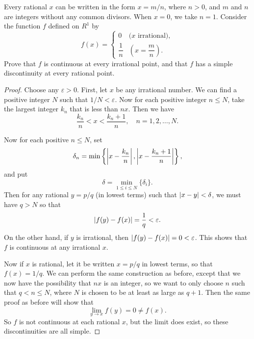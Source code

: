  Every rational $x$ can be written in the form $x = m/n$,
where $n > 0$, and $m$ and $n$ are integers without any common
divisors. When $x = 0$, we take $n = 1$. Consider the function $f$
defined on $R^1$ by
\begin{equation*}
  f(x) =
  \begin{cases}
    0 & \text{($x$ irrational)}, \\[3pt]
    \dfrac1n & \left(x = \dfrac{m}n\right).
  \end{cases}
\end{equation*}
Prove that $f$ is continuous at every irrational point, and that $f$
has a simple discontinuity at every rational point.
\begin{proof}
  Choose any $\varepsilon > 0$. First, let $x$ be any irrational
  number. We can find a positive integer $N$ such that
  $1/N < \varepsilon$. Now for each positive integer $n\leq N$, take
  the largest integer $k_n$ that is less than $nx$. Then we have
  \begin{equation*}
    \frac{k_n}n < x < \frac{k_n+1}n,
    \quad n = 1, 2, \dots, N.
  \end{equation*}

  Now for each positive $n\leq N$, set
  \begin{equation*}
    \delta_n
    = \min\left\{\left\lvert{x - \frac{k_n}n}\right\rvert, \left\lvert{x - \frac{k_n+1}n}\right\rvert\right\},
  \end{equation*}
  and put
  \begin{equation*}
    \delta = \min_{1\leq i\leq N}\{\delta_i\}.
  \end{equation*}
  Then for any rational $y = p/q$ (in lowest terms) such that
  $\lvert{x - y}\rvert < \delta$, we must have $q > N$ so that
  \begin{equation*}
    \lvert{f(y) - f(x)}\rvert = \frac1q < \varepsilon.
  \end{equation*}
  On the other hand, if $y$ is irrational, then
  $\lvert{f(y) - f(x)}\rvert = 0 < \varepsilon$. This shows that $f$ is
  continuous at any irrational $x$.

  Now if $x$ is rational, let it be written $x = p/q$ in lowest terms,
  so that $f(x) = 1/q$. We can perform the same construction as
  before, except that we now have the possibility that $nx$ is an
  integer, so we want to only choose $n$ such that $q < n \leq N$,
  where $N$ is chosen to be at least as large as $q+1$. Then the same
  proof as before will show that
  \begin{equation*}
    \lim_{y\to x}f(y) = 0 \neq f(x).
  \end{equation*}
  So $f$ is not continuous at each rational $x$, but the limit does
  exist, so these discontinuities are all simple.
\end{proof}

